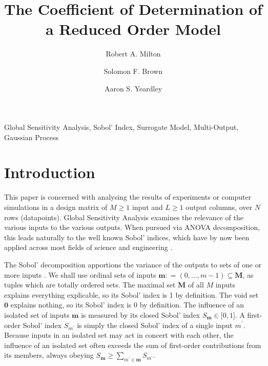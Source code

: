 \documentclass[preprint,12pt]{elsarticle}
\newcommand*{\M}[1]{\ensuremath{#1}\xspace}
\newcommand*{\mi}[1]{\mathbf{#1}}
\newcommand*{\deq}{\M{\mathrel{\mathop:}=}}
\begin{document}
\begin{frontmatter}

    \title{The Coefficient of Determination of a Reduced Order Model}

    \author{Robert A. Milton}

    \author{Solomon F. Brown}

    \author{Aaron S. Yeardley}

    \address{Department of Chemical and Biological Engineering, University of Sheffield, Sheffield, S1 3JD, United Kingdom}       

    \begin{abstract}
    \end{abstract}

    \begin{keyword}
        Global Sensitivity Analysis, Sobol' Index, Surrogate Model, Multi-Output, Gaussian Process
    \end{keyword}

\end{frontmatter}

\section{Introduction}\label{sec:Intro}
    This paper is concerned with analysing the results of experiments or computer simulations in a design matrix of $M\geq 1$ input and $L\geq 1$ output columns, over $N$ rows (datapoints). Global Sensitivity Analysis \cite{Razavi2021} examines the relevance of the various inputs to the various outputs. When pursued via ANOVA decomposition, this leads naturally to the well known Sobol' indices, which have by now been applied across most fields of science and engineering \cite{Saltelli2019,Ghanem2017}. 

    The Sobol' decomposition apportions the variance of the outputs to sets of one or more inputs \cite{Sobol2001}. We shall use ordinal sets of inputs $\mi{m}\deq(0,\ldots ,m-1) \subseteq \mi{M}$, as tuples which are totally ordered sets. The maximal set $\mi{M}$ of all $M$ inputs explains everything explicable, so its Sobol' index is 1 by definition. The void set $\mi{0}$ explains nothing, so its Sobol' index is 0 by definition. 
    The influence of an isolated set of inputs $\mi{m}$ is measured by its closed Sobol' index $S_{\mi{m}} \in \lbrack 0,1\rbrack$. A first-order Sobol' index $S_{m^{\prime}}$ is simply the closed Sobol' index of a single input $m^{\prime}$.
    Because inputs in an isolated set may act in concert with each other, the influence of an isolated set often exceeds the sum of first-order contributions from its members, always obeying $S_{\mi{m}} \geq \sum_{m^{\prime} \in \mi{m}} S_{m^{\prime}}$.
\end{document}
